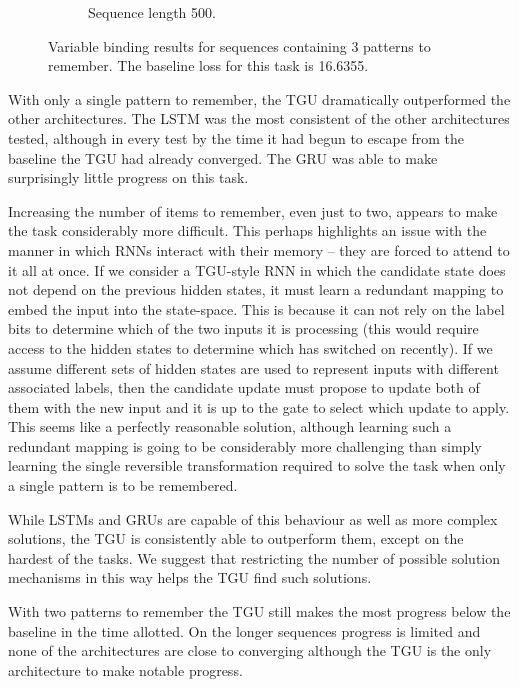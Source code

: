 \begin{figure}[p]
\begin{subfigure}[t]{0.3\linewidth}
	\caption{Sequence length 500.}
\end{subfigure}

\caption[Variable binding results, three patterns]
{Variable binding results for sequences containing \(3\) patterns to remember. The baseline loss for this
task is 16.6355.}
\label{fig:vbindn3}
\end{figure}

With only a single pattern to remember, the TGU dramatically outperformed the other
architectures. The LSTM was the most consistent of the other architectures tested,
although in every test by the time it had begun to escape from the baseline the TGU
had already converged. The GRU was able to make surprisingly little progress on this
task.

Increasing the number of items to remember, even just to two, appears to make the
task considerably more difficult. This perhaps highlights an issue with the manner
in which RNNs interact with their memory -- they are forced to attend to it all
at once. If we consider a TGU-style RNN in which the candidate state does not
depend on the previous hidden states, it must learn a redundant mapping to embed
the input into the state-space. This is because it can not rely on the label
bits to determine which of the two inputs it is processing (this would require
access to the hidden states to determine which has switched on recently). If we
assume different sets of hidden states are used to represent inputs with different
associated labels, then the candidate update must propose to update both of them
with the new input and it is up to the gate to select which update to apply.
This seems like a perfectly reasonable solution, although learning such a redundant
mapping is going to be considerably more challenging than simply learning the single
reversible transformation required to solve the task when only a single pattern
is to be remembered. 

While LSTMs and GRUs are capable of this behaviour as well as more complex solutions,
the TGU is consistently able to outperform them, except on the hardest of the tasks.
We suggest that restricting the number of possible solution mechanisms in this way
helps the TGU find such solutions.

With two patterns to remember the TGU still makes the most progress 
below the baseline in the time allotted.
On the longer sequences progress is limited and none of the architectures
are close to converging although the TGU is the only architecture to
make notable progress.

